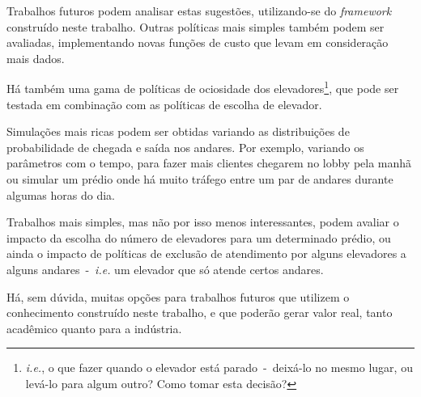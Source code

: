 Trabalhos futuros podem analisar estas sugestões, utilizando-se do
\textit{framework} construído neste trabalho. Outras políticas mais simples
também podem ser avaliadas, implementando novas funções de custo que levam em
consideração mais dados.

Há também uma gama de políticas de ociosidade dos
elevadores\footnote{\textit{i.e.}, o que fazer quando o elevador está
  parado~-~deixá-lo no mesmo lugar, ou levá-lo para algum outro? Como tomar esta
decisão?}, que pode ser testada em combinação com as políticas de escolha de elevador.

Simulações mais ricas podem ser obtidas variando as distribuições de
probabilidade de chegada e saída nos andares. Por exemplo, variando os
parâmetros com o tempo, para fazer mais clientes chegarem no lobby pela manhã ou
simular um prédio onde há muito tráfego entre um par de andares durante algumas
horas do dia.

Trabalhos mais simples, mas não por isso menos interessantes, podem avaliar o
impacto da escolha do número de elevadores para um determinado prédio, ou ainda
o impacto de políticas de exclusão de atendimento por alguns elevadores a alguns
andares~-~\textit{i.e.} um elevador que só atende certos andares.

Há, sem dúvida, muitas opções para trabalhos futuros que utilizem o conhecimento
construído neste trabalho, e que poderão gerar valor real, tanto acadêmico
quanto para a indústria.
